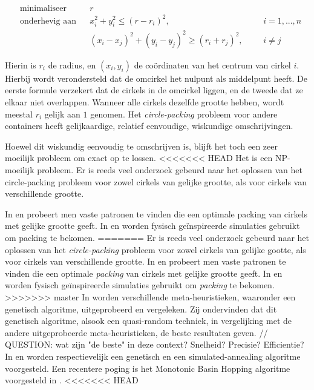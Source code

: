 \documentclass[12pt,a4paper,oneside]{book}
\begin{document}
\begin{equation*}
\begin{aligned}
& \text{minimaliseer}
& & r \\
& \text{onderhevig aan}
& & x_i^2 + y_i^2 \leq (r-r_i)^2, 
& & &i = {1,...,n}\\
&&& (x_i - x_j)^2 + (y_i - y_j)^2 \geq (r_i + r_j)^2,
& & &i \neq j
\end{aligned}
\end{equation*}

Hierin is $r_i$ de radius, en $(x_i,y_i)$ de coördinaten van het centrum van cirkel $i$.
Hierbij wordt verondersteld dat de omcirkel het nulpunt als middelpunt heeft.
De eerste formule verzekert dat de cirkels in de omcirkel liggen, en de tweede dat ze elkaar niet overlappen.
Wanneer alle cirkels dezelfde grootte hebben, wordt meestal $r_i$ gelijk aan $1$ genomen.
Het \textit{circle-packing} probleem voor andere containers heeft gelijkaardige, relatief eenvoudige, wiskundige omschrijvingen.

Hoewel dit wiskundig eenvoudig te omschrijven is, blijft het toch een zeer moeilijk probleem om exact op te lossen.
<<<<<<< HEAD
Het is een NP-moeilijk probleem. Er is reeds veel onderzoek gebeurd naar het oplossen van het circle-packing probleem voor zowel cirkels van gelijke grootte, als voor cirkels van verschillende grootte.

In \cite{graham1996repeated} en \cite{lubachevsky1997curved} probeert men vaste patronen te vinden die een optimale packing van cirkels met gelijke grootte geeft.
In \cite{graham1998dense} en \cite{wang2002improved} worden fysisch geïnspireerde simulaties gebruikt om packing te bekomen.
=======
Er is reeds veel onderzoek gebeurd naar het oplossen van het \textit{circle-packing} probleem voor zowel cirkels van gelijke gootte, als voor cirkels van verschillende grootte.
In \cite{graham1996repeated} en \cite{lubachevsky1997curved} probeert men vaste patronen te vinden die een optimale \textit{packing} van cirkels met gelijke grootte geeft.
In \cite{graham1998dense} en \cite{wang2002improved} worden fysisch geïnspireerde simulaties gebruikt om \textit{packing} te bekomen.
>>>>>>> master
In \cite{george1995packing} worden verschillende meta-heuristieken, waaronder een genetisch algoritme, uitgeprobeerd en vergeleken.
Zij ondervinden dat dit genetisch algoritme, alsook een quasi-random techniek, in vergelijking met de andere uitgeprobeerde meta-heuristieken, de beste resultaten geven. // QUESTION: wat zijn "de beste" in deze context? Snelheid? Precisie? Efficientie?
In \cite{hifi2004approximate} en \cite{hifi2004simulated} worden respectievelijk een genetisch en een simulated-annealing algoritme voorgesteld.
Een recentere poging is het Monotonic Basin Hopping algoritme voorgesteld in \cite{grosso2010}.
<<<<<<< HEAD
\end{document}
